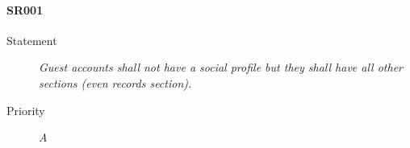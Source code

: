 \paragraph{SR001}
  \begin{description}
  \item [Statement] 
    \textit{ Guest accounts shall not have a social profile but they shall have all other sections (even records section).}
  \item [Priority] \textit{A}
\end{description}